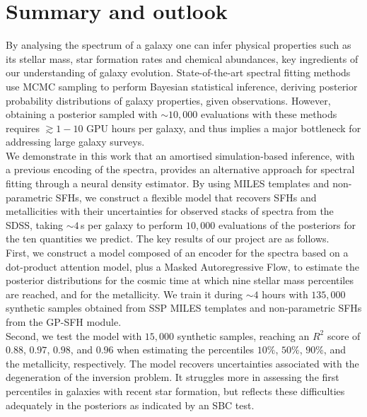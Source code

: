\section{Summary and outlook}

By analysing the spectrum of a galaxy one can infer physical properties such as its stellar mass, star formation rates and chemical abundances, key ingredients of our understanding of galaxy evolution. State-of-the-art spectral fitting methods use MCMC sampling to perform Bayesian statistical inference, deriving posterior probability distributions of galaxy properties, given observations. However, obtaining a posterior sampled with $\sim 10{,}000$ evaluations with these methods requires $\gtrsim 1-10$ GPU hours per galaxy, and thus implies a major bottleneck for addressing large galaxy surveys. \\



We demonstrate in this work that an amortised simulation-based inference, with a previous encoding of the spectra, provides an alternative approach for spectral fitting through a neural density estimator. By using MILES templates and non-parametric SFHs, we construct a flexible model that recovers SFHs and metallicities with their uncertainties for observed stacks of spectra from  the SDSS, taking $\sim 4$\,s per galaxy to perform $10{,}000$ evaluations of the posteriors for the ten quantities we predict. The key results of our project are as follows.\\


    
First, we construct a model composed of an encoder for the spectra based on a dot-product attention model, plus a Masked Autoregressive Flow, to estimate the posterior distributions for the cosmic time at which nine stellar mass percentiles are reached, and for the metallicity. We train it during $\sim4$ hours with $135{,}000$ synthetic samples obtained from SSP MILES templates and non-parametric SFHs from the GP-SFH module.\\

    
 Second, we test the model with $15{,}000$ synthetic samples, reaching an $R^2$ score of $0.88$, $0.97$, $0.98$, and $0.96$ when estimating  the percentiles $10\%$, $50\%$, $90\%$, and the metallicity, respectively. The model recovers uncertainties associated with the degeneration of the inversion problem.  It struggles more in assessing the first percentiles in  galaxies with recent star formation, but reflects these difficulties adequately in the posteriors as indicated by an SBC test.\\
    

